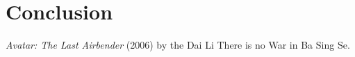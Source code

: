 
\chapter{Conclusion}
\label{chapter:conc}

\begin{wbepi}{\emph{Avatar: The Last Airbender} (2006) by the Dai Li}
There is no War in Ba Sing Se.
\end{wbepi}
